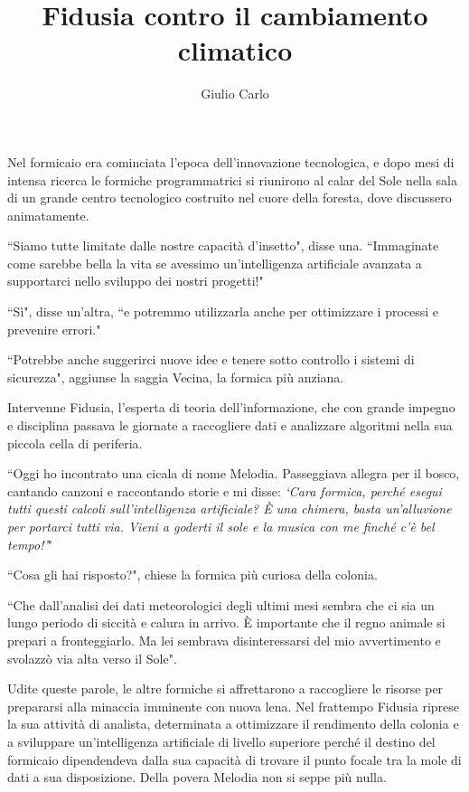 \documentclass[12pt,b5paper]{article}
\author{Giulio Carlo}
\date{}
\title{Fidusia contro il cambiamento climatico}
\begin{document}
\maketitle
{}
Nel formicaio era cominciata l'epoca dell'innovazione tecnologica, e dopo mesi
di intensa ricerca le formiche programmatrici si riunirono al calar del Sole
nella sala di un grande centro tecnologico costruito nel cuore della foresta,
dove discussero animatamente.

``Siamo tutte limitate dalle nostre capacità d'insetto", disse una. ``Immaginate
come sarebbe bella la vita se avessimo un'intelligenza artificiale avanzata a
supportarci nello sviluppo dei nostri progetti!"

``Sì", disse un'altra, ``e potremmo utilizzarla anche per ottimizzare i processi
e prevenire errori."

``Potrebbe anche suggerirci nuove idee e tenere sotto controllo i sistemi di
sicurezza", aggiunse la saggia Vecina, la formica più anziana.

Intervenne Fidusia, l'esperta di teoria dell'informazione, che con grande
impegno e disciplina passava le giornate a raccogliere dati e analizzare
algoritmi nella sua piccola cella di periferia.

``Oggi ho incontrato una cicala di nome Melodia. Passeggiava allegra
per il bosco, cantando canzoni e raccontando storie e mi disse:
\emph{`Cara formica, perché esegui tutti questi calcoli sull'intelligenza
artificiale? È una chimera, basta un'alluvione per portarci tutti via. Vieni
a goderti il sole e la musica con me finché c'è bel tempo!'}"

``Cosa gli hai risposto?", chiese la formica più curiosa della colonia.

``Che dall'analisi dei dati meteorologici degli ultimi mesi sembra che ci sia
un lungo periodo di siccità e calura in arrivo. È importante che il regno
animale si prepari a fronteggiarlo. Ma lei sembrava disinteressarsi del mio
avvertimento e svolazzò via alta verso il Sole".

Udite queste parole, le altre formiche si affrettarono a raccogliere le risorse
per prepararsi alla minaccia imminente con nuova lena. Nel frattempo Fidusia
riprese la sua attività di analista, determinata a ottimizzare il rendimento
della colonia e a sviluppare un'intelligenza artificiale di livello superiore
perché il destino del formicaio dipendendeva dalla sua capacità di trovare il
punto focale tra la mole di dati a sua disposizione. Della povera Melodia non
si seppe più nulla.
\newpage
\end{document}

